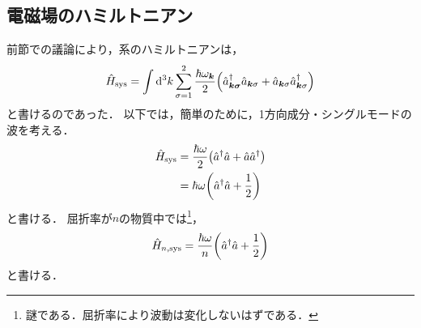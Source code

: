 \documentclass{report}
\begin{document}
  \subsection{電磁場のハミルトニアン}
    前節での議論により，系のハミルトニアンは，
    \begin{align}
      \hat{H}_{\mathrm{sys}} = \int\dd[3]{k} \sum_{\sigma = 1}^{2}\frac{\hbar\omega_{\bm{k}}}{2}\qty(\hat{a}_{\bm{k\sigma}}^{\dag}\hat{a}_{\bm{k}\sigma} + \hat{a}_{\bm{k}\sigma}\hat{a}_{\bm{k}\sigma}^{\dag})
    \end{align}
    と書けるのであった．
    以下では，簡単のために，1方向成分・シングルモードの波を考える．
    \begin{align}
      \hat{H}_{\mathrm{sys}} &= \frac{\hbar\omega}{2}\qty(\hat{a}^{\dag}\hat{a} + \hat{a}\hat{a}^{\dag}) \\ 
      &= \hbar\omega\qty(\hat{a}^{\dag}\hat{a} + \frac{1}{2})
    \end{align}
    と書ける．
    屈折率が$n$の物質中では\footnote{謎である．屈折率により波動は変化しないはずである．}，
    \begin{align}
      \hat{H}_{n, \mathrm{sys}} = \frac{\hbar\omega}{n}\qty(\hat{a}^{\dag}\hat{a} + \frac{1}{2})
    \end{align}
    と書ける．
\end{document}

